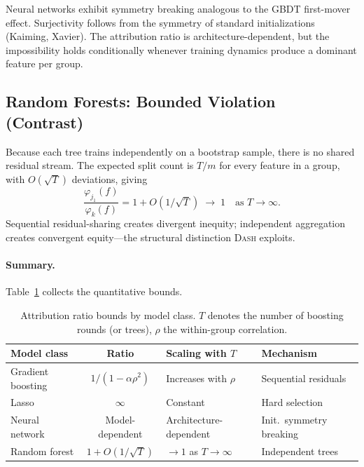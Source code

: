 \documentclass{article}
\newcommand{\DASH}{\textsc{Dash}}
\newcommand{\GBDT}{\textsc{GBDT}}
\begin{document}
Neural networks exhibit symmetry breaking analogous to the \GBDT{} first-mover effect. Surjectivity follows from the symmetry of standard initializations (Kaiming, Xavier). The attribution ratio is architecture-dependent, but the impossibility holds conditionally whenever training dynamics produce a dominant feature per group.

\subsection{Random Forests: Bounded Violation (Contrast)}
\label{sec:rf}

Because each tree trains independently on a bootstrap sample, there is no shared residual stream. The expected split count is $T/m$ for every feature in a group, with $O(\sqrt{T})$ deviations, giving
\[
    \frac{\varphi_{j_1}(f)}{\varphi_k(f)} = 1 + O(1/\sqrt{T}) \;\to\; 1 \quad \text{as } T \to \infty.
\]
Sequential residual-sharing creates divergent inequity; independent aggregation creates convergent equity---the structural distinction \DASH{} exploits.

\paragraph{Summary.}
Table~\ref{tab:model-comparison} collects the quantitative bounds.

\begin{table}[t]
\centering
\caption{Attribution ratio bounds by model class. $T$ denotes the number of boosting rounds (or trees), $\rho$ the within-group correlation.}
\label{tab:model-comparison}
\small
\begin{tabular}{@{}lcll@{}}
\toprule
Model class & Ratio & Scaling with $T$ & Mechanism \\
\midrule
Gradient boosting & $1/(1-\alpha\rho^2)$ & Increases with $\rho$ & Sequential residuals \\
Lasso & $\infty$ & Constant & Hard selection \\
Neural network & Model-dependent & Architecture-dependent & Init.\ symmetry breaking \\
Random forest\footnotemark & $1 + O(1/\sqrt{T})$ & $\to 1$ as $T \to \infty$ & Independent trees \\
\bottomrule
\end{tabular}
\end{table}
\end{document}

